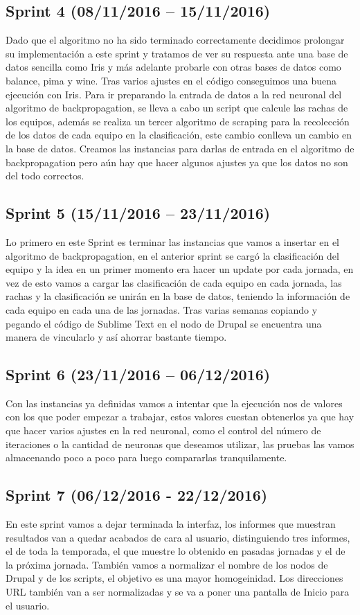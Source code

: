 \subsection{Sprint 4 (08/11/2016 – 15/11/2016)}
Dado que el algoritmo no ha sido terminado correctamente decidimos prolongar su implementación a este sprint y tratamos de ver su respuesta ante una base de datos sencilla como Iris y más adelante probarle con otras bases de datos como balance, pima y wine. Tras varios ajustes en el código conseguimos una buena ejecución  con Iris.
Para ir preparando la entrada de datos a la red neuronal del algoritmo de backpropagation, se lleva a cabo un script que calcule las rachas de los equipos, además se realiza un tercer algoritmo de scraping para la recolección de los datos de cada equipo en la clasificación, este cambio conlleva un cambio en la base de datos.
Creamos las instancias para darlas de entrada en el algoritmo de backpropagation pero aún hay que hacer algunos ajustes ya que los datos no son del todo correctos.

\subsection{Sprint 5 (15/11/2016 – 23/11/2016)}
Lo primero en este Sprint es terminar las instancias que vamos a insertar en el algoritmo de backpropagation, en el anterior sprint se cargó la clasificación del equipo y la idea en un primer momento era hacer un update por cada jornada, en vez de esto vamos a cargar las clasificación de cada equipo en cada jornada, las rachas y la clasificación se unirán en la base de datos, teniendo la información de cada equipo en cada una de las jornadas.
Tras varias semanas copiando y pegando el código de Sublime Text en el nodo de Drupal se encuentra una manera de vincularlo y así ahorrar bastante tiempo.

\subsection{Sprint 6 (23/11/2016 – 06/12/2016)}
Con las instancias ya definidas vamos a intentar que la ejecución nos de valores con los que poder empezar a trabajar, estos valores cuestan obtenerlos ya que hay  que hacer varios ajustes en la red neuronal, como el control del número de iteraciones o la cantidad de neuronas que deseamos utilizar, las pruebas las vamos almacenando poco a poco para luego compararlas tranquilamente.

\subsection{Sprint 7 (06/12/2016 - 22/12/2016)}
En este sprint vamos a dejar terminada la interfaz, los informes que muestran resultados van a quedar acabados de cara al usuario, distinguiendo tres informes, el de toda la temporada, el que muestre lo obtenido en pasadas jornadas y el de la próxima jornada. También vamos a normalizar el nombre de los nodos de Drupal y de los scripts, el objetivo es una mayor homogeinidad. Los direcciones URL también van a ser normalizadas y se va a poner una pantalla de Inicio para el usuario.

